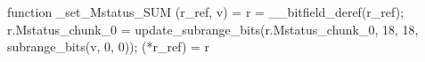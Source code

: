 function _set_Mstatus_SUM (r_ref, v) = {
    r = __bitfield_deref(r_ref);
    r.Mstatus_chunk_0 = update_subrange_bits(r.Mstatus_chunk_0, 18, 18, subrange_bits(v, 0, 0));
    (*r_ref) = r
}
